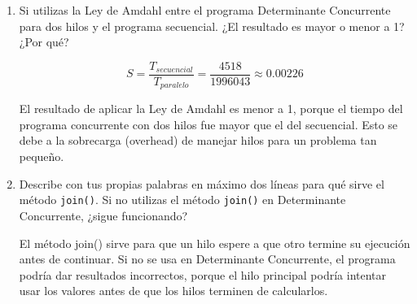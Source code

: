 \documentclass[12pt]{article}
\begin{document}
\begin{enumerate}
    \item Si utilizas la Ley de Amdahl entre el programa Determinante Concurrente para dos hilos y el programa secuencial. ¿El resultado es mayor o menor a 1? ¿Por qué?

    \[S = \frac{T_{secuencial}}{T_{paralelo}} = \frac{4518}{1996043} \approx 0.00226\]


    El resultado de aplicar la Ley de Amdahl es menor a 1, porque el tiempo del programa concurrente con dos hilos fue mayor que el del secuencial. Esto se debe a la sobrecarga (overhead) de manejar hilos para un problema tan pequeño.
    
    \item Describe con tus propias palabras en máximo dos líneas para qué sirve el método \texttt{join()}. Si no utilizas el método \texttt{join()} en Determinante Concurrente, ¿sigue funcionando?

    El método join() sirve para que un hilo espere a que otro termine su ejecución antes de continuar.
    Si no se usa en Determinante Concurrente, el programa podría dar resultados incorrectos, porque el hilo principal podría intentar usar los valores antes de que los hilos terminen de calcularlos.
    
\end{enumerate}
\end{document}
